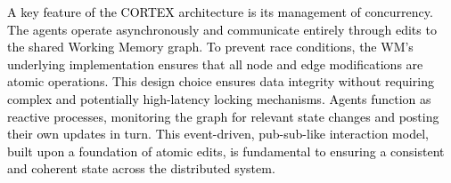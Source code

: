 \documentclass[10pt,a4paper]{article}
\begin{document}
\textcolor{black}{A key feature of the CORTEX architecture is its management of concurrency. The agents operate asynchronously and communicate entirely through edits to the shared Working Memory graph. To prevent race conditions, the WM's underlying implementation ensures that all node and edge modifications are atomic operations. This design choice ensures data integrity without requiring complex and potentially high-latency locking mechanisms. Agents function as reactive processes, monitoring the graph for relevant state changes and posting their own updates in turn. This event-driven, pub-sub-like interaction model, built upon a foundation of atomic edits, is fundamental to ensuring a consistent and coherent state across the distributed system.}



\begin{table}[h]
\centering
\caption{Scene Graph Schema Definition.}
\label{tab:scenegraph_schema}


\end{table}
\end{document}
